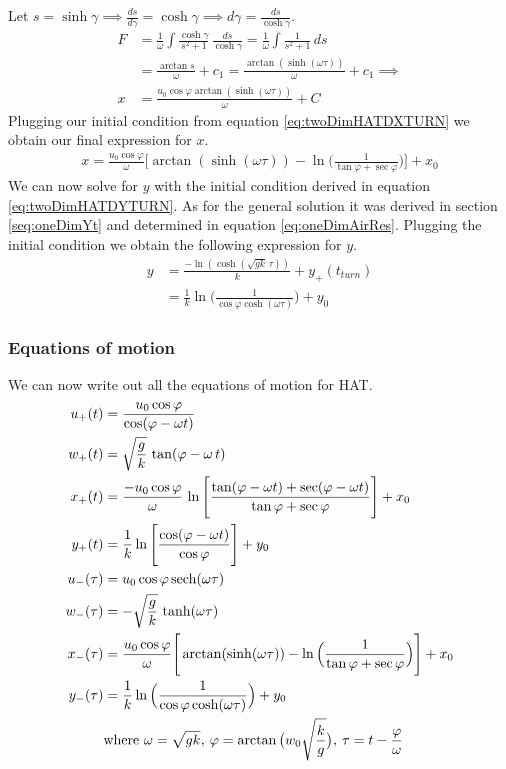 \documentclass[%
aip,
jmp,
amsmath,amssymb,
reprint,%
]{revtex4-1}
\DeclareMathOperator{\sech}{sech}
\newcommand{\comma}{\hspace{0.1mm},\hspace{0.7mm}}
\begin{document}
	Let $s = \sinh\gamma \implies \frac{ds}{d\gamma} = \cosh\gamma \implies d\gamma = \frac{ds}{\cosh\gamma}$.
	\begin{align}\nonumber
		F &= \frac{1}{\omega}\int \frac{\cosh\gamma}{s^2+1} \,\frac{ds}{\cosh\gamma} = \frac{1}{\omega}\int \frac{1}{s^2+1} \,ds\\\nonumber
		&= \frac{\arctan s}{\omega} + c_1 = \frac{\arctan(\sinh(\omega\tau))}{\omega}+c_1 \implies\\\nonumber
		x &= \frac{u_0\cos\varphi\arctan(\sinh(\omega\tau))}{\omega} + C
	\end{align}
	Plugging our initial condition from equation \eqref{eq:twoDimHATDXTURN} we obtain our final expression for $x$.
	\begin{align}\nonumber
		x = \frac{u_0\cos\varphi}{\omega}\Bigg\lbrack \arctan(\sinh(\omega\tau)) - \ln\Big(\frac{1}{\tan\varphi+\sec\varphi}\Big)  \Bigg\rbrack+x_0
	\end{align}
	We can now solve for $y$ with the initial condition derived in equation \eqref{eq:twoDimHATDYTURN}. As for the general solution it was derived in section \ref{seq:oneDimYt} and determined in equation \eqref{eq:oneDimAirRes}. Plugging the initial condition we obtain the following expression for $y$.
	\begin{align}\nonumber
		y &= \frac{-\ln(\cosh(\sqrt{gk}\,\tau))}{k} + y_{+}(t_{turn})\\\nonumber
		&= \frac{1}{k}\ln\Big(\frac{1}{\cos\varphi\cosh(\omega\tau)}\Big) + y_0
	\end{align}
	\subsubsection{Equations of motion}
	We can now write out all the equations of motion for HAT.
	\begin{align*}\nonumber
		u_{+}(t) &= \frac{u_0\cos\varphi}{\cos(\varphi - \omega t)}\\\nonumber
		w_{+}(t) &= \sqrt{\frac{g}{k}}\,\tan(\varphi - \omega\,t)\\\nonumber
		x_{+}(t) &=  	\frac{-u_0\cos\varphi}{\omega}\,\ln\Bigg\lbrack\frac{\tan(\varphi-\omega t)+\sec(\varphi-\omega t)}{\tan\varphi+\sec\varphi}\Bigg\rbrack + x_0\\\nonumber
		y_{+}(t) &= \frac{1}{k}\ln\Bigg\lbrack\frac{\cos(\varphi-\omega t)}{\cos\varphi}\Bigg\rbrack+y_0\\\nonumber
		u_{-}(\tau) &= u_0\cos\varphi\sech(\omega\tau)\\\nonumber
		w_{-}(\tau) &= -\sqrt{\frac{g}{k}}\,\tanh(\omega\tau)\\\nonumber
		x_{-}(\tau) &= \frac{u_0\cos\varphi}{\omega}\Bigg\lbrack \arctan(\sinh(\omega\tau)) - \ln\Big(\frac{1}{\tan\varphi+\sec\varphi}\Big)  \Bigg\rbrack+x_0\\\nonumber
		y_{-}(\tau) &= \frac{1}{k}\ln\Big(\frac{1}{\cos\varphi\cosh(\omega\tau)}\Big)+y_0\\\nonumber
		&\mathrm{where}\,\,\omega = \sqrt{gk} \comma \varphi = \arctan\big(w_0\sqrt{\frac{k}{g}}\big) \comma \tau = t - \frac{\varphi}{\omega}
	\end{align*}
\end{document}
